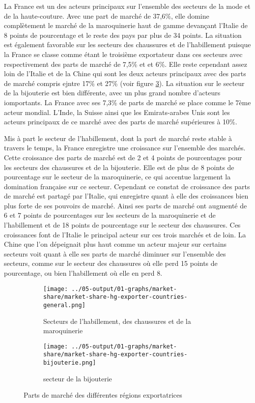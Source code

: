 \documentclass[french,10pt,a4paper]{article}
\begin{document}
La France est un des acteurs principaux sur l'ensemble des secteurs de la mode et de la haute-couture. Avec une part de marché de 37,6\%, elle domine complètement le marché de la maroquinerie haut de gamme devançant l'Italie de 8 points de pourcentage et le reste des pays par plus de 34 points. La situation est également favorable sur les secteurs des chaussures et de l'habillement puisque la France se classe comme étant le troisième exportateur dans ces secteurs avec respectivement des parts de marché de 7,5\% et et 6\%. Elle reste cependant assez loin de l'Italie et de la Chine qui sont les deux acteurs principaux avec des parts de marché compris ejntre 17\% et 27\% (voir figure \ref{fig:market-share}). La situation sur le secteur de la bijouterie est bien différente, avec un plus grand nombre d'acteurs iomportants. La France avec ses 7,3\% de parts de marché se place comme le 7ème acteur mondial. L'Inde, la Suisse ainsi que les Emirats-arabes Unis sont les acteurs principaux de ce marché avec des parts de marché supérieures à 10\%.

Mis à part le secteur de l'habillement, dont la part de marché reste stable à travers le temps, la France enregistre une croissance sur l'ensemble des marchés. Cette croissance des parts de marché est de 2 et 4 points de pourcentages pour les secteurs des chaussures et de la bijouterie. Elle est de plus de 8 points de pourcentage sur le secteur de la maroquinerie, ce qui accentue largement la domination française sur ce secteur. Cependant ce constat de croissance des parts de marché est partagé par l'Italie, qui enregistre quant à elle des croissances bien plus forte de ses pouvoirs de marché. Ainsi ses parts de marché ont augmenté de 6 et 7 points de pourcentages sur les secteurs de la maroquinerie et de l'habillement et de 18 points de pourcentage sur le secteur des chaussures. Ces croissances font de l'Italie le principal acteur sur ces trois marchés et de loin. La Chine que l'on dépeignait plus haut comme un acteur majeur sur certains secteurs voit quant à elle ses parts de marché diminuer sur l'ensemble des secteurs, comme sur le secteur des chaussures où elle perd 15 points de pourcentage, ou bien l'habillement où elle en perd 8. 


\begin{figure}[!h]
  \centering
  \begin{subfigure}{\textwidth}
    \centering    
    \texttt{[image: ../05-output/01-graphs/market-share/market-share-hg-exporter-countries-general.png]}
    \caption{Secteurs de l'habillement, des chaussures et de la maroquinerie}
    \label{fig:market-share-hg-exporter-countries-general}
  \end{subfigure}
  \vspace{0.5cm}
  \begin{subfigure}{\textwidth}
    \centering \texttt{[image: ../05-output/01-graphs/market-share/market-share-hg-exporter-countries-bijouterie.png]}
 \caption{secteur de la bijouterie}
 \label{fig:market-share-hg-exporter-countries-bijouterie}
  \end{subfigure}
  \caption{Parts de marché des différentes régions exportatrices}
  \label{fig:market-share}
\end{figure}
\end{document}
